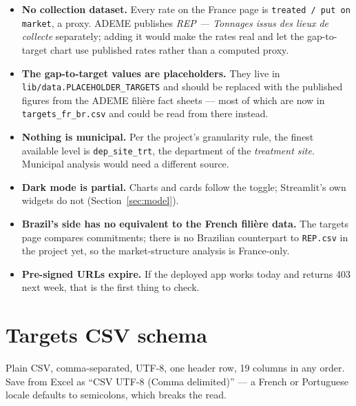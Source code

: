 \documentclass[11pt,a4paper]{article}
\newcommand{\file}[1]{\texttt{#1}}
\begin{document}
\begin{itemize}
  \item \textbf{No collection dataset.} Every rate on the France page is
        \file{treated / put on market}, a proxy. ADEME publishes \emph{REP ---
        Tonnages issus des lieux de collecte} separately; adding it would make
        the rates real and let the gap-to-target chart use published rates
        rather than a computed proxy.
  \item \textbf{The gap-to-target values are placeholders.} They live in
        \file{lib/data.PLACEHOLDER\_TARGETS} and should be replaced with the
        published figures from the ADEME filière fact sheets --- most of which
        are now in \file{targets\_fr\_br.csv} and could be read from there
        instead.
  \item \textbf{Nothing is municipal.} Per the project's granularity rule, the
        finest available level is \file{dep\_site\_trt}, the department of the
        \emph{treatment site}. Municipal analysis would need a different source.
  \item \textbf{Dark mode is partial.} Charts and cards follow the toggle;
        Streamlit's own widgets do not (Section~\ref{sec:model}).
  \item \textbf{Brazil's side has no equivalent to the French filière data.}
        The targets page compares commitments; there is no Brazilian counterpart
        to \file{REP.csv} in the project yet, so the market-structure analysis
        is France-only.
  \item \textbf{Pre-signed URLs expire.} If the deployed app works today and
        returns 403 next week, that is the first thing to check.
\end{itemize}

\newpage
\appendix
\section{Targets CSV schema}\label{sec:schema}

Plain CSV, comma-separated, UTF-8, one header row, 19 columns in any order. Save
from Excel as ``CSV UTF-8 (Comma delimited)'' --- a French or Portuguese locale
defaults to semicolons, which breaks the read.
\end{document}
